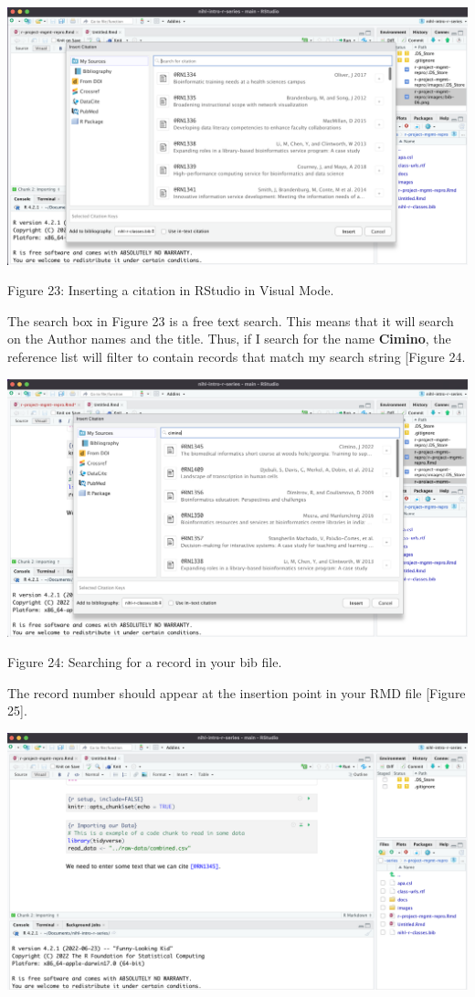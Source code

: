 \documentclass[
]{article}
\begin{document}
\includegraphics[width=6.66667in,height=\textheight]{images/bib-07.png}

Figure 23: Inserting a citation in RStudio in Visual Mode.

The search box in Figure 23 is a free text search. This means that it
will search on the Author names and the title. Thus, if I search for the
name \textbf{Cimino}, the reference list will filter to contain records
that match my search string {[}Figure 24.

\includegraphics[width=6.66667in,height=\textheight]{images/bib-08.png}

Figure 24: Searching for a record in your bib file.

The record number should appear at the insertion point in your RMD file
{[}Figure 25{]}.

\includegraphics[width=6.66667in,height=\textheight]{images/bib-09.png}
\end{document}

